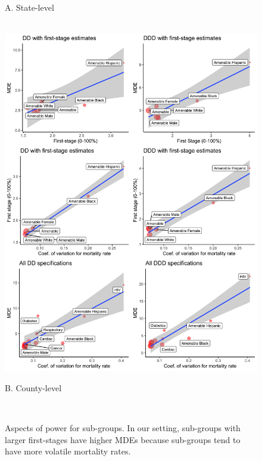 \documentclass[12pt]{article}%
\begin{document}
\begin{landscape}
\begin{figure}[ht]
\caption{Aspects of power for sub-groups. In our setting, sub-groups with larger first-stages have higher MDEs because sub-groups tend to have more volatile mortality rates.}
\begin{minipage}{0.95\linewidth}
  \begin{minipage}[b]{0.45\linewidth}
   \centerline{A. State-level}  ~\\
  \centering
  \includegraphics[width=\textwidth]{../output/figures/mde_by_subgroup_state.png}
  \end{minipage}
  \hspace{1cm}
  \begin{minipage}[b]{0.45\linewidth}
   \centerline{B. County-level} ~\\
  \centering

\end{minipage}
\end{minipage}
\end{figure}
\end{landscape}
\end{document}
